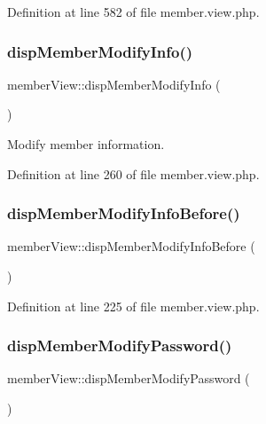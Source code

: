 Definition at line 582 of file member.\+view.\+php.

\hypertarget{classmemberView_a8636a54e610e74b3d5fffa3611589d89}{}\label{classmemberView_a8636a54e610e74b3d5fffa3611589d89} 
\subsubsection{\texorpdfstring{disp\+Member\+Modify\+Info()}{dispMemberModifyInfo()}}
{\footnotesize\ttfamily member\+View\+::disp\+Member\+Modify\+Info (\begin{DoxyParamCaption}{ }\end{DoxyParamCaption})}



Modify member information. 



Definition at line 260 of file member.\+view.\+php.

\hypertarget{classmemberView_a5cb3b51c7c44b99bd37734fc053a06e4}{}\label{classmemberView_a5cb3b51c7c44b99bd37734fc053a06e4} 
\subsubsection{\texorpdfstring{disp\+Member\+Modify\+Info\+Before()}{dispMemberModifyInfoBefore()}}
{\footnotesize\ttfamily member\+View\+::disp\+Member\+Modify\+Info\+Before (\begin{DoxyParamCaption}{ }\end{DoxyParamCaption})}



Definition at line 225 of file member.\+view.\+php.

\hypertarget{classmemberView_a1dd84088d30395acb35e87abfe0a6c53}{}\label{classmemberView_a1dd84088d30395acb35e87abfe0a6c53} 
\subsubsection{\texorpdfstring{disp\+Member\+Modify\+Password()}{dispMemberModifyPassword()}}
{\footnotesize\ttfamily member\+View\+::disp\+Member\+Modify\+Password (\begin{DoxyParamCaption}{ }\end{DoxyParamCaption})}



